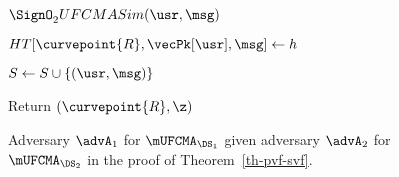 \begin{figure}
{\begin{algorithm-subsequent}{$\SignO_2 UFCMASim(\usr, \msg)$}
				\item $HT[\curvepoint{R}, \vecPk[\usr], \msg] \gets h$
				\item $S \gets S \cup \{(\usr, \msg)\}$
				\item Return $(\curvepoint{R}, \z)$
			\end{algorithm-subsequent} 
		}
		\vspace{-5pt}
		\caption{Adversary $\advA_1$ for $\mUFCMA_{\DS_1}$ given adversary $\advA_2$ for $\mUFCMA_{\DS_2}$ in the proof of Theorem~\ref{th-pvf-svf}.}
		\label{fig:A1}
		\hrulefill
		\vspace{-10pt}
	\end{figure}
	
	
	
	
	
	
	